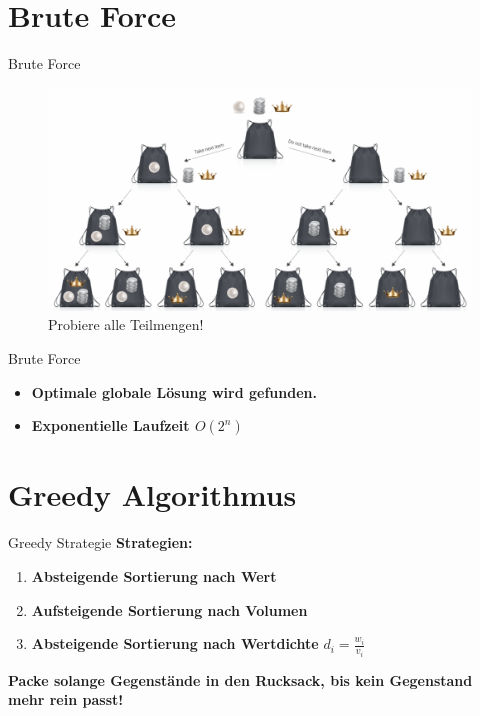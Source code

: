 \documentclass[10pt]{beamer}
\begin{document}
\section*{Brute Force}

\begin{frame}[fragile]{Brute Force}
	\begin{figure}
		\centering
		\includegraphics[width=1\linewidth]{images/rp-bf}
		\caption{Probiere alle Teilmengen!}
		\label{fig:rp-bf}
	\end{figure}
\end{frame}

\begin{frame}[fragile]{Brute Force}
	\begin{itemize}[<+- | alert@+>]
		\item[] \begin{center}
			\textbf{Optimale globale Lösung wird gefunden.}
		\end{center}
	\vspace{1cm}
		\item[] \begin{center}
			\textbf{Exponentielle Laufzeit $O(2^n)$}
		\end{center}
	\end{itemize}
\end{frame}

\section*{Greedy Algorithmus}

\begin{frame}[fragile]{Greedy Strategie}
	\textbf{Strategien:}
	\begin{enumerate}[<+- | alert@+>]
		\item \textbf{Absteigende Sortierung nach Wert}
		\item \textbf{Aufsteigende Sortierung nach Volumen}
		\item \textbf{Absteigende Sortierung nach Wertdichte} \Large{ $d_{i} = \frac{w_{i}}{v_{i}}$}
	\end{enumerate}
	\vspace{1cm}
	\textbf{Packe solange Gegenstände in den Rucksack, bis kein Gegenstand mehr rein passt!}
\end{frame}
\end{document}
